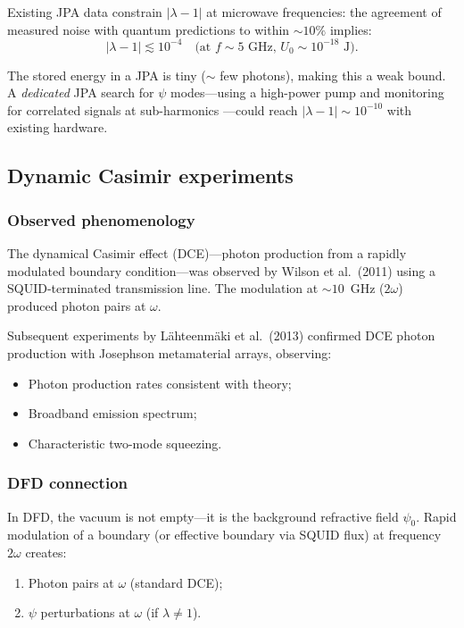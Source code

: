 \documentclass[12pt,aps,prd,twocolumn,superscriptaddress,nofootinbib]{revtex4-2}
\begin{document}
Existing JPA data constrain $|\lambda - 1|$ at microwave frequencies:
the agreement of measured noise with quantum predictions to within
$\sim 10\%$ implies:
\begin{equation}
  |\lambda - 1| \lesssim 10^{-4}\quad
  \text{(at $f \sim 5$~GHz, $U_0 \sim 10^{-18}$~J)}.
  \label{eq:JPA_bound}
\end{equation}

The stored energy in a JPA is tiny ($\sim$ few photons), making this
a weak bound.  A \emph{dedicated} JPA search for $\psi$ modes---using
a high-power pump and monitoring for correlated signals at sub-harmonics
---could reach $|\lambda - 1| \sim 10^{-10}$ with existing hardware.

\subsection{Dynamic Casimir experiments}
\label{sec:DCE}

\subsubsection{Observed phenomenology}

The dynamical Casimir effect (DCE)---photon production from a
rapidly modulated boundary condition---was observed by Wilson et al.\
(2011) using a SQUID-terminated transmission line.  The modulation
at $\sim 10$~GHz ($2\omega$) produced photon pairs at $\omega$.

Subsequent experiments by L\"ahteenm\"aki et al.\ (2013) confirmed DCE
photon production with Josephson metamaterial arrays, observing:
\begin{itemize}[noitemsep]
  \item Photon production rates consistent with theory;
  \item Broadband emission spectrum;
  \item Characteristic two-mode squeezing.
\end{itemize}

\subsubsection{DFD connection}

In DFD, the vacuum is not empty---it is the background refractive field
$\psi_0$.  Rapid modulation of a boundary (or effective boundary via
SQUID flux) at frequency $2\omega$ creates:
\begin{enumerate}[noitemsep]
  \item Photon pairs at $\omega$ (standard DCE);
  \item $\psi$ perturbations at $\omega$ (if $\lambda \neq 1$).
\end{enumerate}
\end{document}
